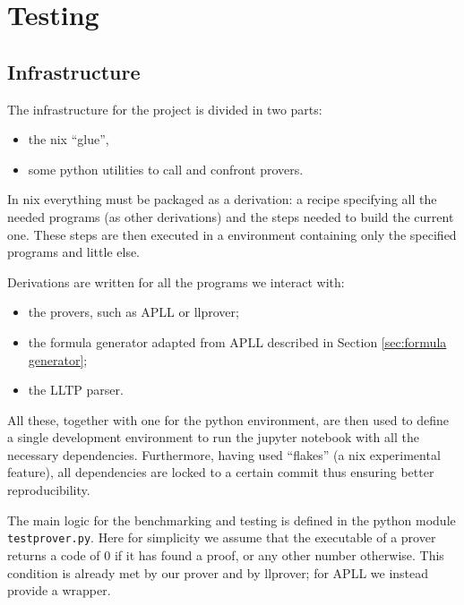 \chapter{Testing}\label{chapter:testing}
\section{Infrastructure}
The infrastructure for the project is divided in two parts:
\begin{itemize}
	\item the nix ``glue'',		%
	\item some python utilities to call and confront provers.
\end{itemize}
In nix everything must be packaged as a derivation: a recipe specifying all the needed programs (as other derivations) and the steps needed to build the current one.
These steps are then executed in a environment containing only the specified programs and little else.

Derivations are written for all the programs we interact with:
\begin{itemize}
	\item the provers, such as APLL or llprover;
	\item the formula generator adapted from APLL described in Section \ref{sec:formula generator};
	\item the LLTP parser.
\end{itemize}
All these, together with one for the python environment, are then used to define a single development environment to run the jupyter notebook with all the necessary dependencies.
Furthermore, having used ``flakes'' (a nix experimental feature), all dependencies are locked to a certain commit thus ensuring better reproducibility.

The main logic for the benchmarking and testing is defined in the python module \texttt{testprover.py}.
Here for simplicity we assume that the executable of a prover returns a code of 0 if it has found a proof, or any other number otherwise.
This condition is already met by our prover and by llprover; for APLL we instead provide a wrapper.

